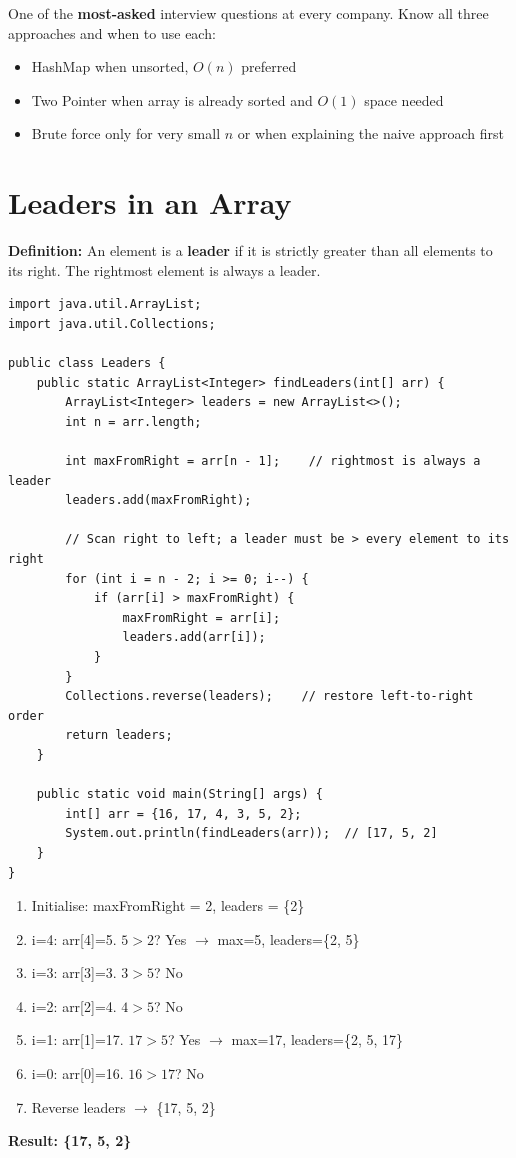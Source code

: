 \documentclass[12pt,a4paper,oneside]{book}
\begin{document}
\begin{interviewcorner}
One of the \textbf{most-asked} interview questions at every company. Know all three approaches and when to use each:
\begin{itemize}
  \item HashMap when unsorted, $O(n)$ preferred
  \item Two Pointer when array is already sorted and $O(1)$ space needed
  \item Brute force only for very small $n$ or when explaining the naive approach first
\end{itemize}
\end{interviewcorner}

\section{Leaders in an Array}

\textbf{Definition:} An element is a \textbf{leader} if it is strictly greater than all elements to its right. The rightmost element is always a leader.

\begin{lstlisting}[caption={Leaders in Array --- Right-to-Left scan, O(n)}]
import java.util.ArrayList;
import java.util.Collections;

public class Leaders {
    public static ArrayList<Integer> findLeaders(int[] arr) {
        ArrayList<Integer> leaders = new ArrayList<>();
        int n = arr.length;

        int maxFromRight = arr[n - 1];    // rightmost is always a leader
        leaders.add(maxFromRight);

        // Scan right to left; a leader must be > every element to its right
        for (int i = n - 2; i >= 0; i--) {
            if (arr[i] > maxFromRight) {
                maxFromRight = arr[i];
                leaders.add(arr[i]);
            }
        }
        Collections.reverse(leaders);    // restore left-to-right order
        return leaders;
    }

    public static void main(String[] args) {
        int[] arr = {16, 17, 4, 3, 5, 2};
        System.out.println(findLeaders(arr));  // [17, 5, 2]
    }
}
\end{lstlisting}

\begin{dryrun}[Dry Run: arr = \{16, 17, 4, 3, 5, 2\}]
\begin{enumerate}
  \item Initialise: maxFromRight = 2, leaders = \{2\}
  \item i=4: arr[4]=5. $5 > 2$? Yes $\to$ max=5, leaders=\{2, 5\}
  \item i=3: arr[3]=3. $3 > 5$? No
  \item i=2: arr[2]=4. $4 > 5$? No
  \item i=1: arr[1]=17. $17 > 5$? Yes $\to$ max=17, leaders=\{2, 5, 17\}
  \item i=0: arr[0]=16. $16 > 17$? No
  \item Reverse leaders $\to$ \{17, 5, 2\}
\end{enumerate}
\textbf{Result: \{17, 5, 2\}}
\end{dryrun}
\end{document}
